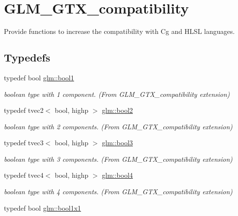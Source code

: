 \hypertarget{group__gtx__compatibility}{}\section{G\+L\+M\+\_\+\+G\+T\+X\+\_\+compatibility}
\label{group__gtx__compatibility}


Provide functions to increase the compatibility with Cg and H\+L\+S\+L languages.  


\subsection*{Typedefs}
\begin{DoxyCompactItemize}
\item 
typedef bool \hyperlink{group__gtx__compatibility_gab65f19f5170f95a2f06d6aa6482c9405}{glm\+::bool1}
\begin{DoxyCompactList}\small\item\em boolean type with 1 component. (From G\+L\+M\+\_\+\+G\+T\+X\+\_\+compatibility extension) \end{DoxyCompactList}\item 
typedef tvec2$<$ bool, highp $>$ \hyperlink{group__gtx__compatibility_gabe088d78d539d2a98a2a04ab798fec1a}{glm\+::bool2}
\begin{DoxyCompactList}\small\item\em boolean type with 2 components. (From G\+L\+M\+\_\+\+G\+T\+X\+\_\+compatibility extension) \end{DoxyCompactList}\item 
typedef tvec3$<$ bool, highp $>$ \hyperlink{group__gtx__compatibility_gab7658aa2e0688b8ac7e640cf7e405c1e}{glm\+::bool3}
\begin{DoxyCompactList}\small\item\em boolean type with 3 components. (From G\+L\+M\+\_\+\+G\+T\+X\+\_\+compatibility extension) \end{DoxyCompactList}\item 
typedef tvec4$<$ bool, highp $>$ \hyperlink{group__gtx__compatibility_ga141861edebf999f94938944f0fb0777a}{glm\+::bool4}
\begin{DoxyCompactList}\small\item\em boolean type with 4 components. (From G\+L\+M\+\_\+\+G\+T\+X\+\_\+compatibility extension) \end{DoxyCompactList}\item 
typedef bool \hyperlink{group__gtx__compatibility_ga98d9d3da22aebc872ba38ce5afa0eff7}{glm\+::bool1x1}

\end{DoxyCompactItemize}
